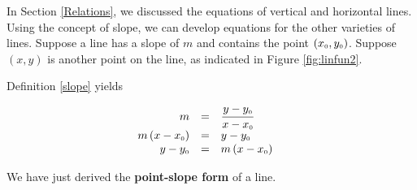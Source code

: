 \smallskip

In Section \ref{Relations}, we discussed the equations of vertical and horizontal lines.  Using the concept of slope, we can develop equations for the other varieties of lines.  Suppose a line has a slope of $m$ and contains the point $\left(x_{\mbox{\tiny$0$}}, y_{\mbox{\tiny$0$}}\right)$.  Suppose $(x,y)$ is another point on the line, as indicated in Figure \ref{fig:linfun2}.


\pagebreak

Definition \ref{slope} yields

\setlength{\extrarowheight}{2pt}

\[ \begin{array}{rclr}  
                      m & = & \dfrac{y - y_{\mbox{\tiny$0$}}}{x-x_{\mbox{\tiny$0$}}} & \\
m\left(x - x_{\mbox{\tiny$0$}}\right) & = & y - y_{\mbox{\tiny$0$}} & \\ 
              y - y_{\mbox{\tiny$0$}} & = & m\left(x - x_{\mbox{\tiny$0$}}\right) & \\
   \end{array} \]

We have just derived the \textbf{point-slope form} of a line.


\smallskip


\medskip

